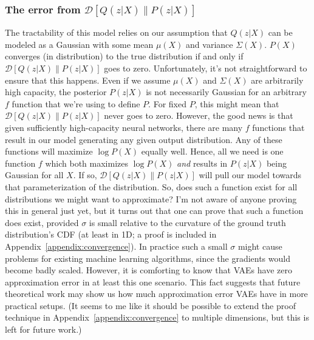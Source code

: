 \documentclass[a4paper, 11pt]{article} %
\begin{document}
\subsubsection{The error from $\mathcal{D}[Q(z|X)\|P(z|X)]$} The tractability of this model relies on our assumption that $Q(z|X)$ can be modeled as a Gaussian with some mean $\mu(X)$ and variance $\Sigma(X)$.  
$P(X)$ converges (in distribution) to the true distribution if and only if $\mathcal{D}[Q(z|X)\|P(z|X)]$ goes to zero.
Unfortunately, it's not straightforward to ensure that this happens. 
Even if we assume $\mu(X)$ and $\Sigma(X)$ are arbitrarily high capacity, the posterior $P(z|X)$ is not necessarily Gaussian for an arbitrary $f$ function that we're using to define $P$.
For fixed $P$, this might mean that $\mathcal{D}[Q(z|X)\|P(z|X)]$ never goes to zero.
However, the good news is that given sufficiently high-capacity neural networks, there are many $f$ functions that result in our model generating any given output distribution.
Any of these functions will maximize $\log P(X)$ equally well.
Hence, all we need is one function $f$ which both maximizes $\log P(X)$ \textit{and} results in $P(z|X)$ being Gaussian for all $X$.
If so, $\mathcal{D}[Q(z|X)\|P(z|X)]$ will pull our model towards that parameterization of the distribution.
So, does such a function exist for all distributions we might want to approximate?
I'm not aware of anyone proving this in general just yet, but it turns out that one can prove that such a function does exist, provided $\sigma$ is small relative to the curvature of the ground truth distribution's CDF (at least in 1D; a proof is included in Appendix~\ref{appendix:convergence}).
In practice such a small $\sigma$ might cause problems for existing machine learning algorithms, since the gradients would become badly scaled.  
However, it is comforting to know that VAEs have zero approximation error in at least this one scenario.
This fact suggests that future theoretical work may show us how much approximation error VAEs have in more practical setups.
(It seems to me like it should be possible to extend the proof technique in Appendix~\ref{appendix:convergence} to multiple dimensions, but this is left for future work.)
\end{document}
